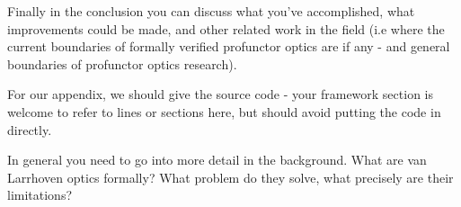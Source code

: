 \documentclass[]{report}
\begin{document}
Finally in the conclusion you can discuss what you've accomplished, what improvements could be made, and other related work in the field (i.e where the current boundaries of formally verified profunctor optics are if any - and general boundaries of profunctor optics research).

For our appendix, we should give the source code - your framework section is welcome to refer to lines or sections here, but should avoid putting the code in directly.

In general you need to go into more detail in the background. What are van Larrhoven optics formally? What problem do they solve, what precisely are their limitations?

\printbibliography
\end{document}
